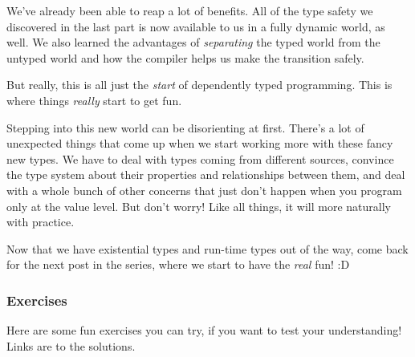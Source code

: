 \documentclass[]{article}
\begin{document}
We've already been able to reap a lot of benefits. All of the type safety we
discovered in the last part is now available to us in a fully dynamic world, as
well. We also learned the advantages of \emph{separating} the typed world from
the untyped world and how the compiler helps us make the transition safely.

But really, this is all just the \emph{start} of dependently typed programming.
This is where things \emph{really} start to get fun.

Stepping into this new world can be disorienting at first. There's a lot of
unexpected things that come up when we start working more with these fancy new
types. We have to deal with types coming from different sources, convince the
type system about their properties and relationships between them, and deal with
a whole bunch of other concerns that just don't happen when you program only at
the value level. But don't worry! Like all things, it will more naturally with
practice.

Now that we have existential types and run-time types out of the way, come back
for the next post in the series, where we start to have the \emph{real} fun! :D

\subsubsection{Exercises}

Here are some fun exercises you can try, if you want to test your understanding!
Links are to the solutions.
\end{document}
